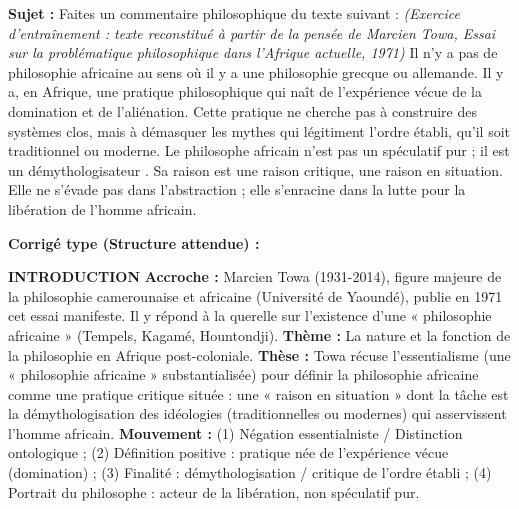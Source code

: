 \documentclass[11pt]{article}
\newcommand{\cle}[1]{{\popxbold\color{popdark}#1}}
\begin{document}
\begin{exoresolu}
\textbf{Sujet :} \guillemotleft Faites un commentaire philosophique du texte suivant : \guillemotright
\textit{(Exercice d'entraînement : texte reconstitué à partir de la pensée de \cle{Marcien Towa}, \emph{Essai sur la problématique philosophique dans l'Afrique actuelle}, 1971)}
\guillemotleft Il n'y a pas de philosophie africaine au sens où il y a une philosophie grecque ou allemande. Il y a, en Afrique, une pratique philosophique qui naît de l'expérience vécue de la domination et de l'aliénation. Cette pratique ne cherche pas à construire des systèmes clos, mais à démasquer les mythes qui légitiment l'ordre établi, qu'il soit traditionnel ou moderne. Le philosophe africain n'est pas un spéculatif pur ; il est un \guillemotleft démythologisateur \guillemotright. Sa raison est une raison critique, une raison en situation. Elle ne s'évade pas dans l'abstraction ; elle s'enracine dans la lutte pour la libération de l'homme africain. \guillemotright

\tcblower
\textbf{Corrigé type (Structure attendue) :}

\textbf{INTRODUCTION}
\textbf{Accroche :} Marcien Towa (1931-2014), figure majeure de la philosophie camerounaise et africaine (Université de Yaoundé), publie en 1971 cet essai manifeste. Il y répond à la querelle sur l'existence d'une « philosophie africaine » (Tempels, Kagamé, Hountondji).
\textbf{Thème :} La nature et la fonction de la philosophie en Afrique post-coloniale.
\textbf{Thèse :} Towa récuse l'essentialisme (une « philosophie africaine » substantialisée) pour définir la philosophie africaine comme une \cle{pratique critique située} : une « raison en situation » dont la tâche est la \cle{démythologisation} des idéologies (traditionnelles ou modernes) qui asservissent l'homme africain.
\textbf{Mouvement :} (1) Négation essentialniste / Distinction ontologique ; (2) Définition positive : pratique née de l'expérience vécue (domination) ; (3) Finalité : démythologisation / critique de l'ordre établi ; (4) Portrait du philosophe : acteur de la libération, non spéculatif pur.


\end{exoresolu}
\end{document}
